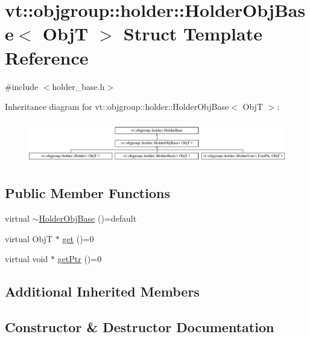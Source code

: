 \hypertarget{structvt_1_1objgroup_1_1holder_1_1_holder_obj_base}{}\section{vt\+:\+:objgroup\+:\+:holder\+:\+:Holder\+Obj\+Base$<$ ObjT $>$ Struct Template Reference}
\label{structvt_1_1objgroup_1_1holder_1_1_holder_obj_base}


{\ttfamily \#include $<$holder\+\_\+base.\+h$>$}

Inheritance diagram for vt\+:\+:objgroup\+:\+:holder\+:\+:Holder\+Obj\+Base$<$ ObjT $>$\+:\begin{figure}[H]
\begin{center}
\leavevmode
\includegraphics[height=1.866667cm]{structvt_1_1objgroup_1_1holder_1_1_holder_obj_base}
\end{center}
\end{figure}
\subsection*{Public Member Functions}
\begin{DoxyCompactItemize}
\item 
virtual \hyperlink{structvt_1_1objgroup_1_1holder_1_1_holder_obj_base_a368d2b1e12c87f11475ecf13dcb66129}{$\sim$\+Holder\+Obj\+Base} ()=default
\item 
virtual ObjT $\ast$ \hyperlink{structvt_1_1objgroup_1_1holder_1_1_holder_obj_base_a4b350b0126259d31a62fd426a08f6698}{get} ()=0
\item 
virtual void $\ast$ \hyperlink{structvt_1_1objgroup_1_1holder_1_1_holder_obj_base_aa08fdb3d076043c004e3674a136f84c3}{get\+Ptr} ()=0
\end{DoxyCompactItemize}
\subsection*{Additional Inherited Members}


\subsection{Constructor \& Destructor Documentation}
\mbox{\label{structvt_1_1objgroup_1_1holder_1_1_holder_obj_base_a368d2b1e12c87f11475ecf13dcb66129}} 
